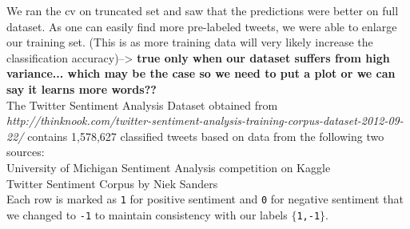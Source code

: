 We ran the cv on truncated set and saw that the predictions were better on full dataset. As one can easily find more pre-labeled tweets, we were able to enlarge our training set. (This is as more training data will very likely increase the classification accuracy)--> \textbf{true only when our dataset suffers from high variance... which may be the case so we need to put a plot or we can say it learns more words??}\\

The Twitter Sentiment Analysis Dataset obtained from \textit{http://thinknook.com/twitter-sentiment-analysis-training-corpus-dataset-2012-09-22/} contains 1,578,627 classified tweets based on data from the following two sources:\\
University of Michigan Sentiment Analysis competition on Kaggle\\
Twitter Sentiment Corpus by Niek Sanders\\	

Each row is marked as \texttt{1} for positive sentiment and \texttt{0} for negative sentiment that we changed to \texttt{-1} to maintain consistency with our labels \texttt{$\{$1,-1$\}$}.